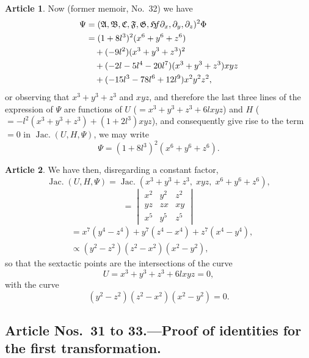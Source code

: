 \documentclass[12pt,a4paper]{article}
\theoremstyle{definition}
\newtheorem{art}{Article}[section]
\DeclareMathOperator{\Jac}{Jac.}
\begin{document}
\begin{art}
Now (former memoir, No.~32) we have
\begin{align*}
\Psi &= (\mathfrak{A}, \mathfrak{B}, \mathfrak{C}, \mathfrak{F}, \mathfrak{G}, \mathfrak{H} \hspace{-2pt} f\partial_x, \partial_y, \partial_z)^2 \Phi \\
&= (1 + 8l^3)^2(x^6 + y^6 + z^6) \\
&\quad + (-9l^2)(x^3 + y^3 + z^3)^2 \\
&\quad + (-2l - 5l^4 - 20l^7)(x^3 + y^3 + z^3)xyz \\
&\quad + (-15l^3 - 78l^6 + 12l^9)x^2y^2z^2,
\end{align*}
or observing that $x^3 + y^3 + z^3$ and $xyz$, and therefore the last three lines of the expression of $\Psi$ are functions of $U$ ($= x^3 + y^3 + z^3 + 6lxyz$) and $H$ ($= -l^2(x^3 + y^3 + z^3) + (1 + 2l^3)xyz$), and consequently give rise to the term $= 0$ in $\Jac(U, H, \Psi)$, we may write
\[
\Psi = (1 + 8l^3)^2(x^6 + y^6 + z^6).
\]
\end{art}

\begin{art}
We have then, disregarding a constant factor,
\[
\Jac(U, H, \Psi) = \Jac(x^3 + y^3 + z^3, \; xyz, \; x^6 + y^6 + z^6),
\]
\[
= \begin{vmatrix}
x^2 & y^2 & z^2 \\
yz & zx & xy \\
x^5 & y^5 & z^5
\end{vmatrix}
\]
\begin{align*}
&= x^7(y^4 - z^4) + y^7(z^4 - x^4) + z^7(x^4 - y^4), \\
&\propto (y^2 - z^2)(z^2 - x^2)(x^2 - y^2),
\end{align*}
so that the sextactic points are the intersections of the curve
\[
U = x^3 + y^3 + z^3 + 6lxyz = 0,
\]
with the curve
\[
(y^2 - z^2)(z^2 - x^2)(x^2 - y^2) = 0.
\]
\end{art}

\subsection*{Article Nos.\ 31 to 33.---Proof of identities for the first transformation.}
\end{document}
